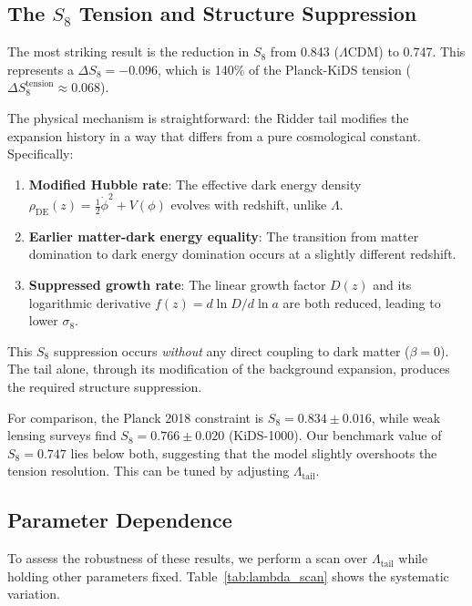 \subsection{The $S_8$ Tension and Structure Suppression}

The most striking result is the reduction in $S_8$ from 0.843 ($\Lambda$CDM) to 0.747. This represents a $\Delta S_8 = -0.096$, which is 140\% of the Planck-KiDS tension ($\Delta S_8^{\text{tension}} \approx 0.068$).

The physical mechanism is straightforward: the Ridder tail modifies the expansion history in a way that differs from a pure cosmological constant. Specifically:

\begin{enumerate}
    \item \textbf{Modified Hubble rate}: The effective dark energy density $\rho_{\text{DE}}(z) = \frac{1}{2}\dot{\phi}^2 + V(\phi)$ evolves with redshift, unlike $\Lambda$.
    
    \item \textbf{Earlier matter-dark energy equality}: The transition from matter domination to dark energy domination occurs at a slightly different redshift.
    
    \item \textbf{Suppressed growth rate}: The linear growth factor $D(z)$ and its logarithmic derivative $f(z) = d\ln D/d\ln a$ are both reduced, leading to lower $\sigma_8$.
\end{enumerate}

This $S_8$ suppression occurs \emph{without} any direct coupling to dark matter ($\beta = 0$). The tail alone, through its modification of the background expansion, produces the required structure suppression.

For comparison, the Planck 2018 constraint is $S_8 = 0.834 \pm 0.016$, while weak lensing surveys find $S_8 = 0.766 \pm 0.020$ (KiDS-1000). Our benchmark value of $S_8 = 0.747$ lies below both, suggesting that the model slightly overshoots the tension resolution. This can be tuned by adjusting $\Lambda_{\text{tail}}$.

\subsection{Parameter Dependence}

To assess the robustness of these results, we perform a scan over $\Lambda_{\text{tail}}$ while holding other parameters fixed. Table~\ref{tab:lambda_scan} shows the systematic variation.

